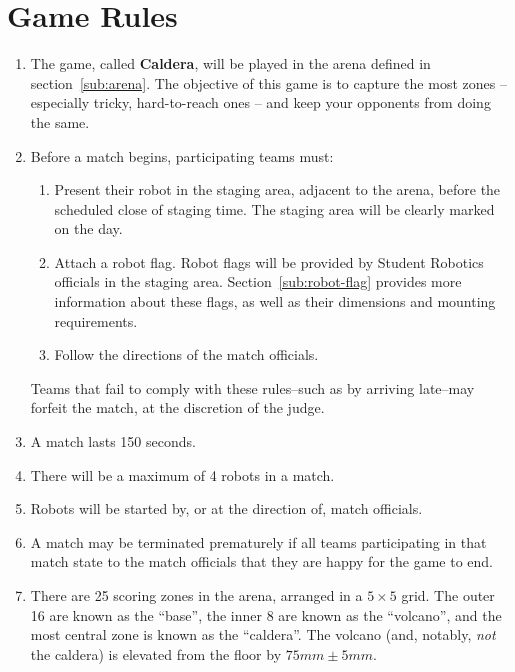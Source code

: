 \section {Game Rules}
\label{game-rules}

\begin{enumerate}
\item The game, called \textbf{Caldera}, will be played in the arena defined in section~\ref{sub:arena}.  The objective of this game is to capture the most zones -- especially tricky, hard-to-reach ones -- and keep your opponents from doing the same.

\item Before a match begins, participating teams must:
\begin {enumerate}
  \item Present their robot in the staging area, adjacent to the arena, before the scheduled close of staging time.
        The staging area will be clearly marked on the day.

  \item Attach a robot flag.
        Robot flags will be provided by Student Robotics officials in the staging area.
        Section~\ref{sub:robot-flag} provides more information about these flags, as well as their dimensions and mounting requirements.

  \item Follow the directions of the match officials.
\end{enumerate}
  Teams that fail to comply with these rules--such as by arriving late--may forfeit the match, at the discretion of the judge.

\item A match lasts 150 seconds.

\item There will be a maximum of 4 robots in a match.

\item Robots will be started by, or at the direction of, match officials.

\item A match may be terminated prematurely if all teams participating in that match state to the match officials that they are happy for the game to end.

\item There are 25 scoring zones in the arena, arranged in a $5\times5$ grid. The outer 16 are known as the ``base'', the inner 8 are known as the ``volcano'', and the most central zone is known as the ``caldera''. The volcano (and, notably, \emph{not} the caldera) is elevated from the floor by $75 mm \pm 5 mm$.


\end{enumerate}
